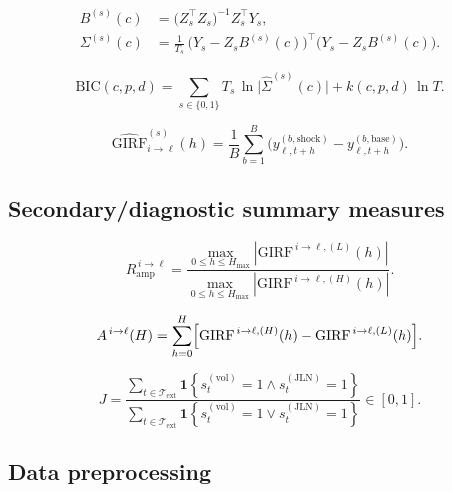 \documentclass[
  11pt,
]{article}
\begin{document}
\begin{subequations}\label{eq:b-s-c}
\begin{align}
B^{(s)}(c) &= \bigl(Z_s^{\top} Z_s\bigr)^{-1} Z_s^{\top} Y_s, \label{eq:b-s-c-beta}\\
\Sigma^{(s)}(c) &= \frac{1}{T_s}\,\bigl(Y_s - Z_s B^{(s)}(c)\bigr)^{\top}\!\bigl(Y_s - Z_s B^{(s)}(c)\bigr). \label{eq:b-s-c-sigma}
\end{align}
\end{subequations}

\begin{equation}\label{eq:bic}
\mathrm{BIC}(c,p,d)
= \sum_{s \in \{0,1\}} T_s \,\ln\!\bigl|\hat{\Sigma}^{(s)}(c)\bigr|
+ k(c,p,d)\,\ln T.
\end{equation}

\begin{equation}\label{eq:hatgirf}
\widehat{\mathrm{GIRF}}_{i \to \ell}^{(s)}(h)
=
\frac{1}{B}\sum_{b=1}^{B}
\bigl(
y_{\ell,t+h}^{(b,\text{shock})}
-
y_{\ell,t+h}^{(b,\text{base})}
\bigr).
\end{equation}

\subsection{Secondary/diagnostic summary measures}\label{secondarydiagnostic-summary-measures}

\begin{equation}\label{eq:r-amp}
R_{\mathrm{amp}}^{\,i \to \ell}
=
\frac{\displaystyle \max_{0 \le h \le H_{\max}} \left| \mathrm{GIRF}^{\,i \to \ell,(L)}(h) \right|}
{\displaystyle \max_{0 \le h \le H_{\max}} \left| \mathrm{GIRF}^{\,i \to \ell,(H)}(h) \right| }.
\end{equation}

\begin{equation}\label{eq:a-ell}
A^{\,i \to \ell}(H)
=
\sum_{h=0}^{H}
\Bigl[
\mathrm{GIRF}^{\,i \to \ell,(H)}(h)
-
\mathrm{GIRF}^{\,i \to \ell,(L)}(h)
\Bigr].
\end{equation}

\begin{equation}\label{eq:j}
J =
\frac{\displaystyle \sum_{t \in \mathcal{T}_{\mathrm{ext}}}
\mathbf{1}\!\left\{ s_t^{(\mathrm{vol})}=1 \wedge s_t^{(\mathrm{JLN})}=1 \right\}}
{\displaystyle \sum_{t \in \mathcal{T}_{\mathrm{ext}}}
\mathbf{1}\!\left\{ s_t^{(\mathrm{vol})}=1 \vee s_t^{(\mathrm{JLN})}=1 \right\}}
\in [0,1].
\end{equation}

\subsection{Data preprocessing}\label{data-preprocessing}
\end{document}
